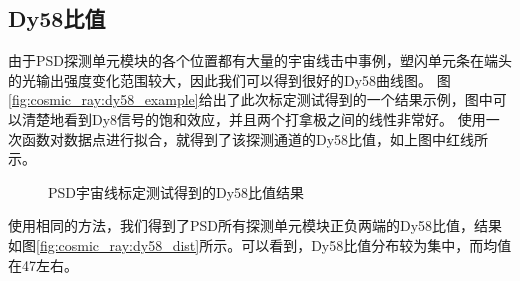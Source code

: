 \subsection{Dy58比值}
\label{sec:cosmic_ray:dy58}
由于PSD探测单元模块的各个位置都有大量的宇宙线击中事例，塑闪单元条在端头的光输出强度变化范围较大，因此我们可以得到很好的Dy58曲线图。
图\ref{fig:cosmic_ray:dy58_example}给出了此次标定测试得到的一个结果示例，图中可以清楚地看到Dy8信号的饱和效应，并且两个打拿极之间的线性非常好。
使用一次函数对数据点进行拟合，就得到了该探测通道的Dy58比值，如上图中红线所示。
\begin{figure}[htb]
\centering
{}
\caption{PSD宇宙线标定测试得到的Dy58比值结果}
\label{fig:cosmic_ray:dy58_results}
\end{figure}

使用相同的方法，我们得到了PSD所有探测单元模块正负两端的Dy58比值，结果如图\ref{fig:cosmic_ray:dy58_dist}所示。可以看到，Dy58比值分布较为集中，而均值在47左右。

